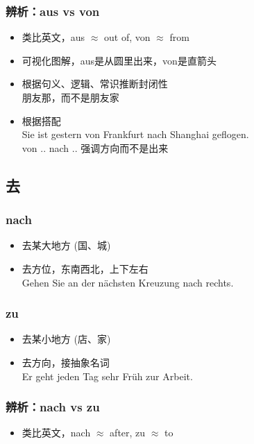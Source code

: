 \subsubsection{辨析：aus vs von}
\begin{itemize}
    \item 类比英文，aus $\approx$ out of, von $\approx$ from
    \item 可视化图解，aus是从圆里出来，von是直箭头
    \item 根据句义、逻辑、常识推断封闭性 \\
          朋友那，而不是朋友家
    \item 根据搭配 \\
          Sie ist gestern von Frankfurt nach Shanghai geflogen. \\
          von .. nach .. 强调方向而不是出来
\end{itemize}


\subsection{去}

\subsubsection{nach \olive[border=true]}
\begin{itemize}
    \item 去某大地方 (国、城)
    \item 去方位，东南西北，上下左右 \\
          Gehen Sie an der nächsten Kreuzung nach rechts. \\

\end{itemize}

\subsubsection{zu \olive[border=true]}
\begin{itemize}
    \item 去某小地方 (店、家)
    \item 去方向，接抽象名词 \\
          Er geht jeden Tag sehr Früh zur Arbeit.
\end{itemize}

\subsubsection{辨析：nach vs zu}
\begin{itemize}
    \item 类比英文，nach $\approx$ after, zu $\approx$ to
\end{itemize}


